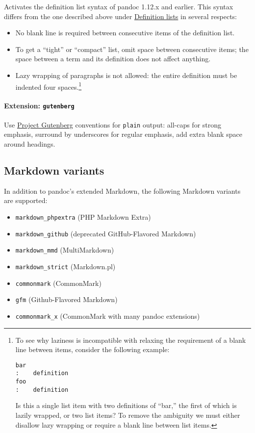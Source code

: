 \documentclass[]{article}
\providecommand{\tightlist}{%
  \setlength{\itemsep}{0pt}\setlength{\parskip}{0pt}}
\begin{document}
Activates the definition list syntax of pandoc 1.12.x and earlier. This
syntax differs from the one described above under
\protect\hyperlink{definition-lists}{Definition lists} in several
respects:

\begin{itemize}
\tightlist
\item
  No blank line is required between consecutive items of the definition
  list.
\item
  To get a ``tight'' or ``compact'' list, omit space between consecutive
  items; the space between a term and its definition does not affect
  anything.
\item
  Lazy wrapping of paragraphs is not allowed: the entire definition must
  be indented four spaces.\footnote{To see why laziness is incompatible
    with relaxing the requirement of a blank line between items,
    consider the following example:

\begin{Verbatim}
bar
:    definition
foo
:    definition
\end{Verbatim}

    Is this a single list item with two definitions of ``bar,'' the
    first of which is lazily wrapped, or two list items? To remove the
    ambiguity we must either disallow lazy wrapping or require a blank
    line between list items.}
\end{itemize}

\hypertarget{extension-gutenberg}{%
\paragraph{\texorpdfstring{Extension:
\texttt{gutenberg}}{Extension: gutenberg}}\label{extension-gutenberg}}

Use \href{https://www.gutenberg.org}{Project Gutenberg} conventions for
\texttt{plain} output: all-caps for strong emphasis, surround by
underscores for regular emphasis, add extra blank space around headings.

\hypertarget{markdown-variants}{%
\subsection{Markdown variants}\label{markdown-variants}}

In addition to pandoc's extended Markdown, the following Markdown
variants are supported:

\begin{itemize}
\tightlist
\item
  \texttt{markdown\_phpextra} (PHP Markdown Extra)
\item
  \texttt{markdown\_github} (deprecated GitHub-Flavored Markdown)
\item
  \texttt{markdown\_mmd} (MultiMarkdown)
\item
  \texttt{markdown\_strict} (Markdown.pl)
\item
  \texttt{commonmark} (CommonMark)
\item
  \texttt{gfm} (Github-Flavored Markdown)
\item
  \texttt{commonmark\_x} (CommonMark with many pandoc extensions)
\end{itemize}
\end{document}
